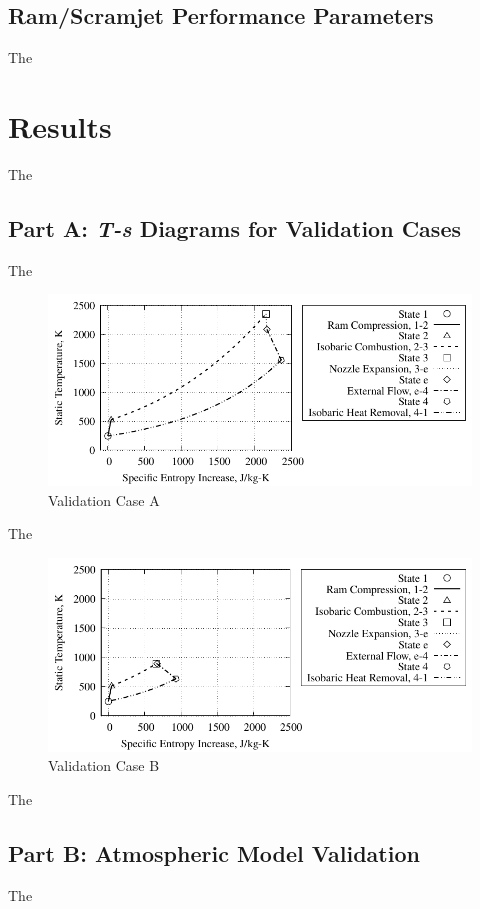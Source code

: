 \documentclass[conf]{new-aiaa} %
\begin{document}
\subsection{Ram/Scramjet Performance Parameters}
The


\section{Results}
The

\subsection{Part A: \textit{T-s} Diagrams for Validation Cases}
The

\begin{figure}[hbt!]
\centering
\includegraphics[]{media/ts_plot_files/TS_plot_for_case_7.pdf}
\caption{\label{fig:partavalida} Validation Case A}
\end{figure}
The

\begin{figure}[hbt!]
\centering
\includegraphics[]{media/ts_plot_files/TS_plot_for_case_8.pdf}
\caption{\label{fig:partavalidb} Validation Case B}
\end{figure}
The

\subsection{Part B: Atmospheric Model Validation}
The
\end{document}
